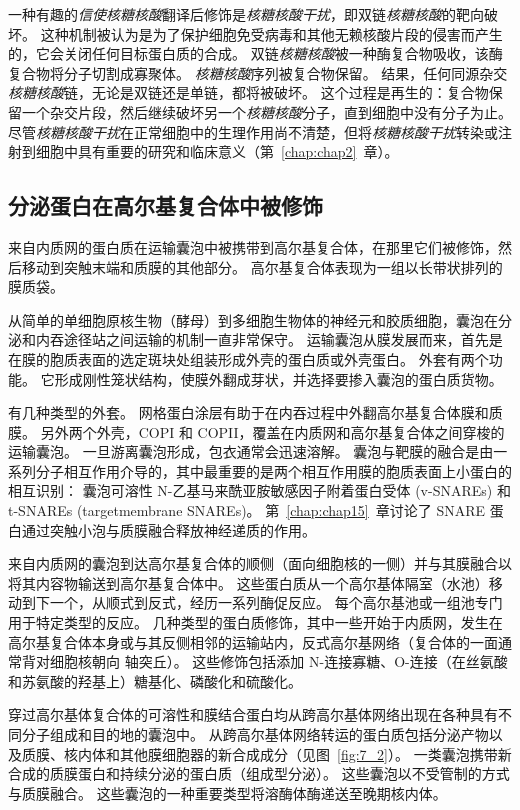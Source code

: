 一种有趣的\textit{信使核糖核酸}翻译后修饰是\textit{核糖核酸干扰}，即双链\textit{核糖核酸}的靶向破坏。
这种机制被认为是为了保护细胞免受病毒和其他无赖核酸片段的侵害而产生的，它会关闭任何目标蛋白质的合成。 
双链\textit{核糖核酸}被一种酶复合物吸收，该酶复合物将分子切割成寡聚体。
\textit{核糖核酸}序列被复合物保留。
结果，任何同源杂交\textit{核糖核酸}链，无论是双链还是单链，都将被破坏。
这个过程是再生的：复合物保留一个杂交片段，然后继续破坏另一个\textit{核糖核酸}分子，直到细胞中没有分子为止。
尽管\textit{核糖核酸干扰}在正常细胞中的生理作用尚不清楚，但将\textit{核糖核酸干扰}转染或注射到细胞中具有重要的研究和临床意义（第~\ref{chap:chap2}~章）。



\subsection{分泌蛋白在高尔基复合体中被修饰}

来自内质网的蛋白质在运输囊泡中被携带到高尔基复合体，在那里它们被修饰，然后移动到突触末端和质膜的其他部分。
高尔基复合体表现为一组以长带状排列的膜质袋。


从简单的单细胞原核生物（酵母）到多细胞生物体的神经元和胶质细胞，囊泡在分泌和内吞途径站之间运输的机制一直非常保守。
运输囊泡从膜发展而来，首先是在膜的胞质表面的选定斑块处组装形成外壳的蛋白质或外壳蛋白。
外套有两个功能。
它形成刚性笼状结构，使膜外翻成芽状，并选择要掺入囊泡的蛋白质货物。


有几种类型的外套。
网格蛋白涂层有助于在内吞过程中外翻高尔基复合体膜和质膜。
另外两个外壳，COPI 和 COPII，覆盖在内质网和高尔基复合体之间穿梭的运输囊泡。
一旦游离囊泡形成，包衣通常会迅速溶解。
囊泡与靶膜的融合是由一系列分子相互作用介导的，其中最重要的是两个相互作用膜的胞质表面上小蛋白的相互识别：
囊泡可溶性 N-乙基马来酰亚胺敏感因子附着蛋白受体 (v-SNAREs) 和 t-SNAREs (targetmembrane SNAREs)。
第~\ref{chap:chap15}~章讨论了 SNARE 蛋白通过突触小泡与质膜融合释放神经递质的作用。


来自内质网的囊泡到达高尔基复合体的顺侧（面向细胞核的一侧）并与其膜融合以将其内容物输送到高尔基复合体中。
这些蛋白质从一个高尔基体隔室（水池）移动到下一个，从顺式到反式，经历一系列酶促反应。
每个高尔基池或一组池专门用于特定类型的反应。
几种类型的蛋白质修饰，其中一些开始于内质网，发生在高尔基复合体本身或与其反侧相邻的运输站内，反式高尔基网络（复合体的一面通常背对细胞核朝向 轴突丘）。
这些修饰包括添加 N-连接寡糖、O-连接（在丝氨酸和苏氨酸的羟基上）糖基化、磷酸化和硫酸化。


穿过高尔基体复合体的可溶性和膜结合蛋白均从跨高尔基体网络出现在各种具有不同分子组成和目的地的囊泡中。 
从跨高尔基体网络转运的蛋白质包括分泌产物以及质膜、核内体和其他膜细胞器的新合成成分（见图~\ref{fig:7_2}）。
一类囊泡携带新合成的质膜蛋白和持续分泌的蛋白质（组成型分泌）。
这些囊泡以不受管制的方式与质膜融合。
这些囊泡的一种重要类型将溶酶体酶递送至晚期核内体。


